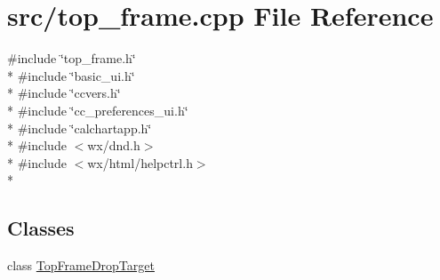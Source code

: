 \hypertarget{a00248}{\section{src/top\-\_\-frame.cpp File Reference}
\label{a00248}
}
{\ttfamily \#include \char`\"{}top\-\_\-frame.\-h\char`\"{}}\\*
{\ttfamily \#include \char`\"{}basic\-\_\-ui.\-h\char`\"{}}\\*
{\ttfamily \#include \char`\"{}ccvers.\-h\char`\"{}}\\*
{\ttfamily \#include \char`\"{}cc\-\_\-preferences\-\_\-ui.\-h\char`\"{}}\\*
{\ttfamily \#include \char`\"{}calchartapp.\-h\char`\"{}}\\*
{\ttfamily \#include $<$wx/dnd.\-h$>$}\\*
{\ttfamily \#include $<$wx/html/helpctrl.\-h$>$}\\*
\subsection*{Classes}
\begin{DoxyCompactItemize}
\item 
class \hyperlink{a00147}{Top\-Frame\-Drop\-Target}
\end{DoxyCompactItemize}
